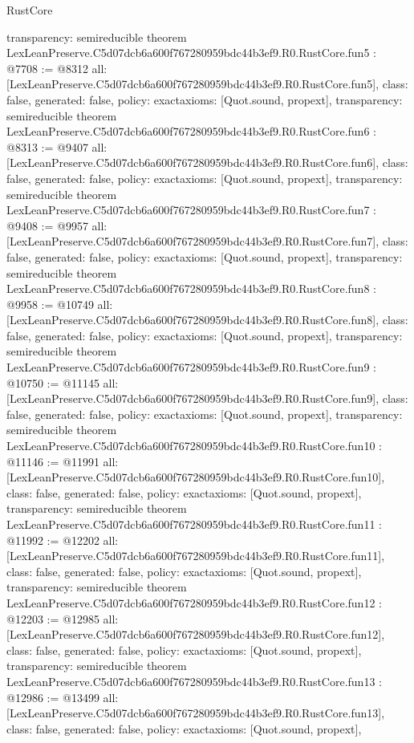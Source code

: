\begin{lexlean}{RustCore}
\begin{coremodule}
{  transparency: semireducible
}
theorem LexLeanPreserve.C5d07dcb6a600f767280959bdc44b3ef9.R0.RustCore.fun5 : @7708 := @8312 {
  all: [LexLeanPreserve.C5d07dcb6a600f767280959bdc44b3ef9.R0.RustCore.fun5],
  class: false,
  generated: false,
  policy: exact{axioms: [Quot.sound, propext]},
  transparency: semireducible
}
theorem LexLeanPreserve.C5d07dcb6a600f767280959bdc44b3ef9.R0.RustCore.fun6 : @8313 := @9407 {
  all: [LexLeanPreserve.C5d07dcb6a600f767280959bdc44b3ef9.R0.RustCore.fun6],
  class: false,
  generated: false,
  policy: exact{axioms: [Quot.sound, propext]},
  transparency: semireducible
}
theorem LexLeanPreserve.C5d07dcb6a600f767280959bdc44b3ef9.R0.RustCore.fun7 : @9408 := @9957 {
  all: [LexLeanPreserve.C5d07dcb6a600f767280959bdc44b3ef9.R0.RustCore.fun7],
  class: false,
  generated: false,
  policy: exact{axioms: [Quot.sound, propext]},
  transparency: semireducible
}
theorem LexLeanPreserve.C5d07dcb6a600f767280959bdc44b3ef9.R0.RustCore.fun8 : @9958 := @10749 {
  all: [LexLeanPreserve.C5d07dcb6a600f767280959bdc44b3ef9.R0.RustCore.fun8],
  class: false,
  generated: false,
  policy: exact{axioms: [Quot.sound, propext]},
  transparency: semireducible
}
theorem LexLeanPreserve.C5d07dcb6a600f767280959bdc44b3ef9.R0.RustCore.fun9 : @10750 := @11145 {
  all: [LexLeanPreserve.C5d07dcb6a600f767280959bdc44b3ef9.R0.RustCore.fun9],
  class: false,
  generated: false,
  policy: exact{axioms: [Quot.sound, propext]},
  transparency: semireducible
}
theorem LexLeanPreserve.C5d07dcb6a600f767280959bdc44b3ef9.R0.RustCore.fun10 : @11146 := @11991 {
  all: [LexLeanPreserve.C5d07dcb6a600f767280959bdc44b3ef9.R0.RustCore.fun10],
  class: false,
  generated: false,
  policy: exact{axioms: [Quot.sound, propext]},
  transparency: semireducible
}
theorem LexLeanPreserve.C5d07dcb6a600f767280959bdc44b3ef9.R0.RustCore.fun11 : @11992 := @12202 {
  all: [LexLeanPreserve.C5d07dcb6a600f767280959bdc44b3ef9.R0.RustCore.fun11],
  class: false,
  generated: false,
  policy: exact{axioms: [Quot.sound, propext]},
  transparency: semireducible
}
theorem LexLeanPreserve.C5d07dcb6a600f767280959bdc44b3ef9.R0.RustCore.fun12 : @12203 := @12985 {
  all: [LexLeanPreserve.C5d07dcb6a600f767280959bdc44b3ef9.R0.RustCore.fun12],
  class: false,
  generated: false,
  policy: exact{axioms: [Quot.sound, propext]},
  transparency: semireducible
}
theorem LexLeanPreserve.C5d07dcb6a600f767280959bdc44b3ef9.R0.RustCore.fun13 : @12986 := @13499 {
  all: [LexLeanPreserve.C5d07dcb6a600f767280959bdc44b3ef9.R0.RustCore.fun13],
  class: false,
  generated: false,
  policy: exact{axioms: [Quot.sound, propext]},
}
\end{coremodule}
\end{lexlean}
